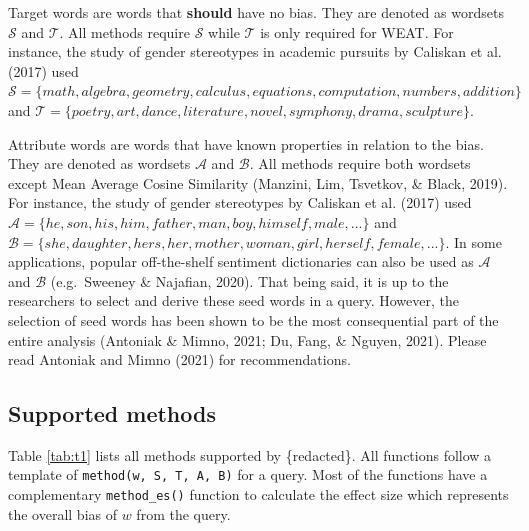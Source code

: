 \documentclass[english,man,mask]{apa6}
\begin{document}
Target words are words that \textbf{should} have no bias. They are denoted as wordsets \(\mathcal{S}\) and \(\mathcal{T}\). All methods require \(\mathcal{S}\) while \(\mathcal{T}\) is only required for WEAT. For instance, the study of gender stereotypes in academic pursuits by Caliskan et al. (2017) used \(\mathcal{S} = \{math, algebra, geometry, calculus, equations, computation, numbers, addition\}\) and \(\mathcal{T}= \{poetry, art, dance, literature, novel, symphony, drama, sculpture\}\).

Attribute words are words that have known properties in relation to the bias. They are denoted as wordsets \(\mathcal{A}\) and \(\mathcal{B}\). All methods require both wordsets except Mean Average Cosine Similarity (Manzini, Lim, Tsvetkov, \& Black, 2019). For instance, the study of gender stereotypes by Caliskan et al. (2017) used \(\mathcal{A} = \{he, son, his, him, father, man, boy, himself, male, ...\}\) and \(\mathcal{B} = \{she, daughter, hers, her, mother, woman, girl, herself, female, ...\}\). In some applications, popular off-the-shelf sentiment dictionaries can also be used as \(\mathcal{A}\) and \(\mathcal{B}\) (e.g.~Sweeney \& Najafian, 2020). That being said, it is up to the researchers to select and derive these seed words in a query. However, the selection of seed words has been shown to be the most consequential part of the entire analysis (Antoniak \& Mimno, 2021; Du, Fang, \& Nguyen, 2021). Please read Antoniak and Mimno (2021) for recommendations.

\hypertarget{supported-methods}{%
\subsection{Supported methods}\label{supported-methods}}

Table \ref{tab:t1} lists all methods supported by \{redacted\}. All functions follow a template of \texttt{method(w,\ S,\ T,\ A,\ B)} for a query. Most of the functions have a complementary \texttt{method\_es()} function to calculate the effect size which represents the overall bias of \(w\) from the query.
\end{document}
